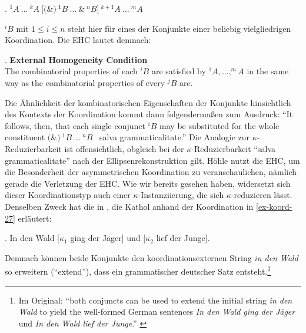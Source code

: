 \ex. \label{ex-hoehle-90-1} $^1\!A \ \ldots \ ^k\!A \ [($\&$) \ ^1\!B \ \ldots \ \& \ ^n\!B] \ ^{k+1}\!A \ \ldots \ ^m\!A$ \hfill \citep[(1)]{Hoehle:90}

$^i\!B$ mit $1 \leq i \leq n$ steht hier für eines der Konjunkte einer beliebig vielgliedrigen Koordination. Die EHC lautet demnach: 

\ex. \label{ex-hoehle-90-3}
{\bf External Homogeneity Condition} \hfill \citep[(3)]{Hoehle:90} \\
The combinatorial properties of each $^i\!B$ are satisfied by $^1\!A , \ldots , ^m\!A$ in the same way as the combinatorial properties of every $^j\!B$ are.

Die Ähnlichkeit der kombinatorischen Eigenschaften der Konjunkte hinsichtlich des Kontexts der Koordination kommt dann folgenderma\ss en zum Ausdruck: "`It follows, then, that each single conjunct $^i\!B$ may be substituted for the whole constituent \glq$($\&$) \ ^1\!B \ \ldots \ ^n\!B$\grq~ salva grammaticalitate."' \citep[222]{Hoehle:90} Die Analogie zur $\kappa$-Reduzierbarkeit ist offensichtlich, obgleich bei der $\kappa$-Reduzierbarkeit "`salva grammaticalitate"' nach der Ellipsenrekonstruktion gilt. Höhle nutzt die EHC, um die Besonderheit der asymmetrischen Koordination zu veranschaulichen, nämlich gerade die Verletzung der EHC. Wie wir bereits gesehen haben, widersetzt sich dieser Koordinationstyp auch einer $\kappa$-Instanziierung, die sich $\kappa$-reduzieren lässt. Denselben Zweck hat die  in \cite{Kathol:99}, die Kathol anhand der Koordination in \ref{ex-koord-27} erläutert:

\ex. \label{ex-koord-27}In den Wald [$\kappa_1$ ging der Jäger] und [$\kappa_2$ lief der Junge].\hfill \citep[(1)]{Kathol:99}   

Demnach können beide Konjunkte den koordinationsexternen String {\it in den Wald} so erweitern ("`extend"'), dass ein grammatischer deutscher Satz entsteht.\footnote{Im Original: "`both conjuncts can be used to extend the initial string {\it in den Wald} to yield the well-formed German sentences {\it In den Wald ging der Jäger} und {\it In den Wald lief der Junge}."' \citep[305]{Kathol:99}} 

